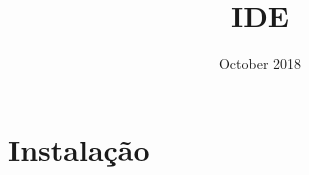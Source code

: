 \documentclass{article}
\title{IDE}
\author{}
\date{October 2018}
\begin{document}
\maketitle


\section{Instalação}



\newpage

\end{document}
